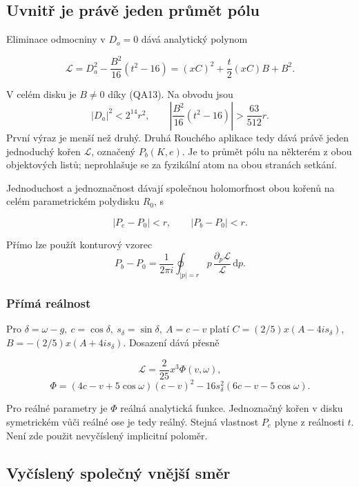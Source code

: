 \documentclass[11pt,a4paper]{article}
\theoremstyle{remark}\newtheorem{remark}[theorem]{Poznámka}
\numberwithin{equation}{section}
\begin{document}
\hypertarget{uvnitux159-je-pruxe1vux11b-jeden-prux16fmux11bt-puxf3lu}{%
\subsection{Uvnitř je právě jeden průmět
pólu}\label{uvnitux159-je-pruxe1vux11b-jeden-prux16fmux11bt-puxf3lu}}

Eliminace odmocniny v \(D_o=0\) dává analytický polynom

\[
\mathcal L=D_a^2-\frac{B^2}{16}(t^2-16)
=(xC)^2+\frac t2(xC)B+B^2.
\tag{QA16}
\]

V celém disku je \(B\ne0\) díky (QA13). Na obvodu jsou \[
|D_a|^2<2^{14}r^2,\qquad
\left|\frac{B^2}{16}(t^2-16)\right|>\frac{63}{512}r.
\] První výraz je menší než druhý. Druhá Rouchého aplikace tedy dává
právě jeden jednoduchý kořen \(\mathcal L\), označený \(P_b(K,e)\). Je
to průmět pólu na některém z obou objektových listů; neprohlašuje se za
fyzikální atom na obou stranách setkání.

Jednoduchost a jednoznačnost dávají společnou holomorfnost obou kořenů
na celém parametrickém polydisku \(R_0\), s

\[
|P_e-P_0|<r,\qquad |P_b-P_0|<r.
\tag{QA17}
\]

Přímo lze použít konturový vzorec \[
P_b-P_0=\frac1{2\pi i}\oint_{|p|=r}
p\,\frac{\partial_p\mathcal L}{\mathcal L}\,\mathrm dp.
\]

\hypertarget{pux159uxedmuxe1-reuxe1lnost}{%
\subsubsection{Přímá reálnost}\label{pux159uxedmuxe1-reuxe1lnost}}

Pro \(\delta=\omega-g,\ c=\cos\delta,\ s_\delta=\sin\delta,\ A=c-v\)
platí \(C=(2/5)x(A-4is_\delta)\), \(B=-(2/5)x(A+4is_\delta)\). Dosazení
dává přesně

\[
\boxed{\mathcal L=\frac2{25}x^3\Phi(v,\omega),}
\tag{QA18}
\] \[
\Phi=(4c-v+5\cos\omega)(c-v)^2
-16s_\delta^2(6c-v-5\cos\omega).
\]

Pro reálné parametry je \(\Phi\) reálná analytická funkce. Jednoznačný
kořen v disku symetrickém vůči reálné ose je tedy reálný. Stejná
vlastnost \(P_e\) plyne z reálnosti \(t\). Není zde použit nevyčíslený
implicitní poloměr.

\hypertarget{vyux10duxedslenuxfd-spoleux10dnuxfd-vnux11bjux161uxed-smux11br}{%
\subsection{Vyčíslený společný vnější
směr}\label{vyux10duxedslenuxfd-spoleux10dnuxfd-vnux11bjux161uxed-smux11br}}
\end{document}
